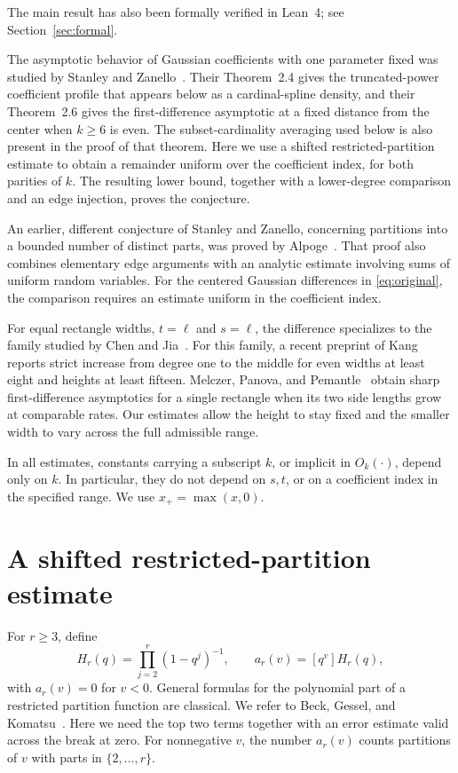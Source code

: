 \documentclass[3p,11pt,number]{elsarticle}
\theoremstyle{remark}
\numberwithin{equation}{section}
\newcommand{\coeff}[1]{[q^{#1}]}
\begin{document}
The main result has also been formally verified in Lean~4; see Section~\ref{sec:formal}.

The asymptotic behavior of Gaussian coefficients with one parameter
fixed was studied by Stanley and Zanello~\cite{SZ16}.
Their Theorem~2.4 gives the truncated-power coefficient profile
that appears below as a cardinal-spline density, and their
Theorem~2.6 gives the first-difference asymptotic
at a fixed distance from the center when \(k\ge6\) is even.
The subset-cardinality averaging used below is also present in the
proof of that theorem. Here we use a shifted restricted-partition
estimate to obtain a remainder uniform over the coefficient index,
for both parities of \(k\). The resulting lower bound, together with
a lower-degree comparison and an edge injection, proves the
conjecture.

An earlier, different conjecture of Stanley and Zanello, concerning
partitions into a bounded number of distinct parts, was proved by
Alpoge~\cite{Alpoge14}. That proof also combines elementary edge
arguments with an analytic estimate involving sums of uniform random
variables. For the centered Gaussian differences in \eqref{eq:original}, the
comparison requires an estimate uniform in the coefficient index.

For equal rectangle widths, $t=\ell$ and $s=\ell$, the difference
specializes to the family studied by Chen and Jia~\cite{CJ}.
For this family, a recent preprint of Kang~\cite{Kang} reports strict
increase from degree one to the middle for even widths at least eight
and heights at least fifteen. Melczer, Panova, and Pemantle~\cite{MPP}
obtain sharp first-difference asymptotics for a single rectangle when
its two side lengths grow at comparable rates. Our estimates allow the
height to stay fixed and the smaller width to vary across the full
admissible range.

In all estimates, constants carrying a subscript \(k\), or implicit
in \(O_k(\cdot)\), depend only on \(k\). In particular, they do not
depend on \(s,t\), or on a coefficient index in the specified range.
We use \(x_+=\max(x,0)\).

\section{A shifted restricted-partition estimate}

For \(r\ge3\), define
\begin{equation}\label{eq:restricted}
H_r(q)=\prod_{j=2}^{r}(1-q^j)^{-1},
\qquad a_r(v)=\coeff{v}H_r(q),
\end{equation}
with \(a_r(v)=0\) for \(v<0\).
General formulas for the polynomial part of a restricted partition
function are classical. We refer to Beck, Gessel, and
Komatsu~\cite{BGK}. Here we need the top two terms together with an
error estimate valid across the break at zero.
For nonnegative \(v\), the number \(a_r(v)\) counts partitions of \(v\)
with parts in \(\{2,\ldots,r\}\).
\end{document}
